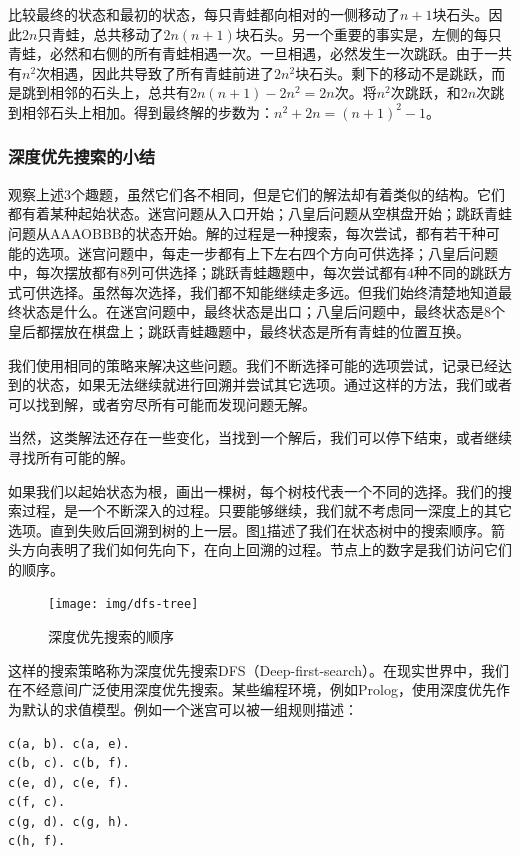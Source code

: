 \documentclass[b5paper]{ctexart}
\begin{document}
比较最终的状态和最初的状态，每只青蛙都向相对的一侧移动了$n+1$块石头。因此$2n$只青蛙，总共移动了$2n(n+1)$块石头。另一个重要的事实是，左侧的每只青蛙，必然和右侧的所有青蛙相遇一次。一旦相遇，必然发生一次跳跃。由于一共有$n^2$次相遇，因此共导致了所有青蛙前进了$2n^2$块石头。剩下的移动不是跳跃，而是跳到相邻的石头上，总共有$2n(n+1) - 2n^2 = 2n$次。将$n^2$次跳跃，和$2n$次跳到相邻石头上相加。得到最终解的步数为：$n^2 + 2n = (n+1)^2 -1$。

\subsubsection{深度优先搜索的小结}

观察上述3个趣题，虽然它们各不相同，但是它们的解法却有着类似的结构。它们都有着某种起始状态。迷宫问题从入口开始；八皇后问题从空棋盘开始；跳跃青蛙问题从AAAOBBB的状态开始。解的过程是一种搜索，每次尝试，都有若干种可能的选项。迷宫问题中，每走一步都有上下左右四个方向可供选择；八皇后问题中，每次摆放都有8列可供选择；跳跃青蛙趣题中，每次尝试都有4种不同的跳跃方式可供选择。虽然每次选择，我们都不知能继续走多远。但我们始终清楚地知道最终状态是什么。在迷宫问题中，最终状态是出口；八皇后问题中，最终状态是8个皇后都摆放在棋盘上；跳跃青蛙趣题中，最终状态是所有青蛙的位置互换。

我们使用相同的策略来解决这些问题。我们不断选择可能的选项尝试，记录已经达到的状态，如果无法继续就进行回溯并尝试其它选项。通过这样的方法，我们或者可以找到解，或者穷尽所有可能而发现问题无解。

当然，这类解法还存在一些变化，当找到一个解后，我们可以停下结束，或者继续寻找所有可能的解。

如果我们以起始状态为根，画出一棵树，每个树枝代表一个不同的选择。我们的搜索过程，是一个不断深入的过程。只要能够继续，我们就不考虑同一深度上的其它选项。直到失败后回溯到树的上一层。图\ref{fig:dfs-tree}描述了我们在状态树中的搜索顺序。箭头方向表明了我们如何先向下，在向上回溯的过程。节点上的数字是我们访问它们的顺序。

\begin{figure}[htbp]
 \centering
 \texttt{[image: img/dfs-tree]}
 \caption{深度优先搜索的顺序}
 \label{fig:dfs-tree}
\end{figure}

这样的搜索策略称为深度优先搜索DFS（Deep-first-search）。在现实世界中，我们在不经意间广泛使用深度优先搜索。某些编程环境，例如Prolog，使用深度优先作为默认的求值模型。例如一个迷宫可以被一组规则描述：

\lstset{language=Prolog}
\begin{lstlisting}
c(a, b). c(a, e).
c(b, c). c(b, f).
c(e, d), c(e, f).
c(f, c).
c(g, d). c(g, h).
c(h, f).
\end{lstlisting}
\end{document}
